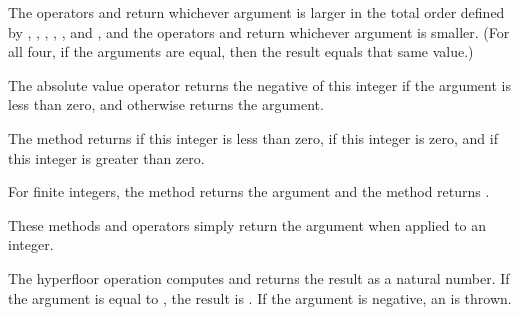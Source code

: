 The operators  and  return whichever argument is larger
in the total order defined by \EXP{<}, \EXP{\leq}, \EXP{=}, \EXP{\geq}, \EXP{>}, and ,
and the operators  and  return whichever argument is smaller.
(For all four, if the arguments are equal, then the result equals that same value.)



The absolute value operator \EXP{\left|\ldots\right|} returns the negative of this integer
if the argument is less than zero, and otherwise returns the argument.



The method  returns  if this integer is less than zero,
 if this integer is zero, and  if this integer is greater than zero.



For finite integers, the method  returns the argument
and the method  returns .



These methods and operators simply return the argument when applied to an integer.



The hyperfloor operation  computes 
and returns the result as a natural number.
If the argument is equal to , the result is .
If the argument is negative, an  is thrown.

